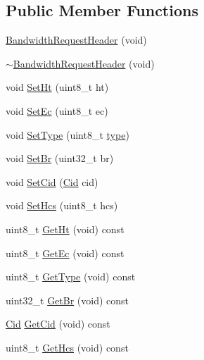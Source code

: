 \subsection*{Public Member Functions}
\begin{DoxyCompactItemize}
\item 
\hyperlink{classns3_1_1BandwidthRequestHeader_aad68bc2ddb2b2d152d32166904d35d69}{Bandwidth\+Request\+Header} (void)
\item 
\hyperlink{classns3_1_1BandwidthRequestHeader_ac27100b70323ab96e94c1f818ea584fd}{$\sim$\+Bandwidth\+Request\+Header} (void)
\item 
void \hyperlink{classns3_1_1BandwidthRequestHeader_aa2aa3bd6c59b39ebbe99da31145220f3}{Set\+Ht} (uint8\+\_\+t ht)
\item 
void \hyperlink{classns3_1_1BandwidthRequestHeader_a2fb1fbad0be2bdc830aa798e571f9fb4}{Set\+Ec} (uint8\+\_\+t ec)
\item 
void \hyperlink{classns3_1_1BandwidthRequestHeader_a3b6bd3b18d10a9593bafd06e709851ca}{Set\+Type} (uint8\+\_\+t \hyperlink{visualizer-ideas_8txt_add98db9e15e2a58cf2b57623e7aa893a}{type})
\item 
void \hyperlink{classns3_1_1BandwidthRequestHeader_a26d7323dc1c4d9c9a246f2717080f396}{Set\+Br} (uint32\+\_\+t br)
\item 
void \hyperlink{classns3_1_1BandwidthRequestHeader_aa8e5dd0baddf49a56df26244b6aceecb}{Set\+Cid} (\hyperlink{classns3_1_1Cid}{Cid} cid)
\item 
void \hyperlink{classns3_1_1BandwidthRequestHeader_a83cda5c3a4bbe58e8124f03018820403}{Set\+Hcs} (uint8\+\_\+t hcs)
\item 
uint8\+\_\+t \hyperlink{classns3_1_1BandwidthRequestHeader_a0a877e97a910346e9d4125b2bd19d961}{Get\+Ht} (void) const 
\item 
uint8\+\_\+t \hyperlink{classns3_1_1BandwidthRequestHeader_a4ed163106a21178803264f00c4f2ce35}{Get\+Ec} (void) const 
\item 
uint8\+\_\+t \hyperlink{classns3_1_1BandwidthRequestHeader_abb8fb3cbf325bc824fe5f2aec3142385}{Get\+Type} (void) const 
\item 
uint32\+\_\+t \hyperlink{classns3_1_1BandwidthRequestHeader_a975465988d3440b9cd5123502b71362e}{Get\+Br} (void) const 
\item 
\hyperlink{classns3_1_1Cid}{Cid} \hyperlink{classns3_1_1BandwidthRequestHeader_aef8443021e9756bfa1029110d29a7aba}{Get\+Cid} (void) const 
\item 
uint8\+\_\+t \hyperlink{classns3_1_1BandwidthRequestHeader_a8b3ff6958eb138764227ed13e5af2d30}{Get\+Hcs} (void) const 

\end{DoxyCompactItemize}
